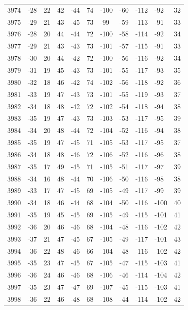 \begin{table}[H]
\begin{tabular}{lllllllllll}
3974 & -28 & 22 & 42 & -44 & 74 & -100 & -60 & -112 & -92 & 32 \\
3975 & -29 & 21 & 43 & -45 & 73 & -99 & -59 & -113 & -91 & 33 \\
3976 & -28 & 20 & 44 & -44 & 72 & -100 & -58 & -114 & -92 & 34 \\
3977 & -29 & 21 & 43 & -43 & 73 & -101 & -57 & -115 & -91 & 33 \\
3978 & -30 & 20 & 44 & -42 & 72 & -100 & -56 & -116 & -92 & 34 \\
3979 & -31 & 19 & 45 & -43 & 73 & -101 & -55 & -117 & -93 & 35 \\
3980 & -32 & 18 & 46 & -42 & 74 & -102 & -56 & -118 & -92 & 36 \\
3981 & -33 & 19 & 47 & -43 & 73 & -101 & -55 & -119 & -93 & 37 \\
3982 & -34 & 18 & 48 & -42 & 72 & -102 & -54 & -118 & -94 & 38 \\
3983 & -35 & 19 & 47 & -43 & 73 & -103 & -53 & -117 & -95 & 39 \\
3984 & -34 & 20 & 48 & -44 & 72 & -104 & -52 & -116 & -94 & 38 \\
3985 & -35 & 19 & 47 & -45 & 71 & -105 & -53 & -117 & -95 & 37 \\
3986 & -34 & 18 & 48 & -46 & 72 & -106 & -52 & -116 & -96 & 38 \\
3987 & -35 & 17 & 49 & -45 & 71 & -105 & -51 & -117 & -97 & 39 \\
3988 & -34 & 16 & 48 & -44 & 70 & -106 & -50 & -116 & -98 & 38 \\
3989 & -33 & 17 & 47 & -45 & 69 & -105 & -49 & -117 & -99 & 39 \\
3990 & -34 & 18 & 46 & -44 & 68 & -104 & -50 & -116 & -100 & 40 \\
3991 & -35 & 19 & 45 & -45 & 69 & -105 & -49 & -115 & -101 & 41 \\
3992 & -36 & 20 & 46 & -46 & 68 & -104 & -48 & -116 & -102 & 42 \\
3993 & -37 & 21 & 47 & -45 & 67 & -105 & -49 & -117 & -101 & 43 \\
3994 & -36 & 22 & 48 & -46 & 66 & -104 & -48 & -116 & -102 & 42 \\
3995 & -35 & 23 & 47 & -45 & 67 & -105 & -47 & -115 & -103 & 41 \\
3996 & -36 & 24 & 46 & -46 & 68 & -106 & -46 & -114 & -104 & 42 \\
3997 & -35 & 23 & 47 & -47 & 69 & -107 & -45 & -115 & -103 & 41 \\
3998 & -36 & 22 & 46 & -48 & 68 & -108 & -44 & -114 & -102 & 42 \\

\end{tabular}
\end{table}
